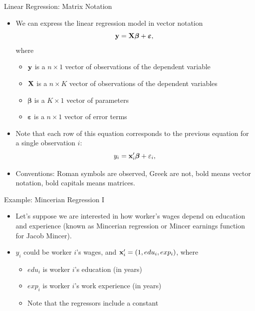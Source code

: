 \documentclass[english,xcolor={dvipsnames},aspectratio=169]{beamer}
\begin{document}
\begin{frame}{Linear Regression: Matrix Notation}
	\begin{itemize}
	\item We can express the linear regression model in vector notation
	\begin{equation*}
		{\bf y}= {\bf X} \boldsymbol{\beta} + \boldsymbol{\varepsilon},
	\end{equation*}
	where 
	\begin{itemize}
		\item ${\bf y}$ is a $n\times 1$ vector of observations of the dependent variable
		\item ${\bf X}$ is a $n\times K$ vector of observations of the dependent variables
		\item $\boldsymbol{\beta} $ is a $K\times 1$ vector of parameters
		\item $\boldsymbol{\varepsilon}$ is a $n\times 1$ vector of error terms
	\end{itemize}

	\item Note that each row of this equation corresponds to the previous equation for
	a single observation $i$:\[
	y_i = {\bf x}_{i}'\boldsymbol{\beta} + \varepsilon_i,
	\]

	\item Conventions: Roman symbols are observed, Greek are not, bold means vector notation, 
	bold capitals means matrices.
\end{itemize}
\end{frame}

\begin{frame}{Example: Mincerian Regression I}
\begin{itemize}
	\item Let's suppose we are interested in how worker's wages depend on education and experience
	(known as Mincerian regression or Mincer earnings function for Jacob Mincer).

	\medskip
	\item $y_{i}$ could be worker $i$'s wages, and ${\bf x}_i' = \left(1,edu_i,exp_i \right)$, 
	where 
	\begin{itemize}
		\item $edu_i$ is worker $i$'s education (in years)
		\item $exp_i$ is worker $i$'s work experience (in years)
		\item Note that the regressors include a constant 
	\end{itemize}
\end{itemize}
\end{frame}
\end{document}
